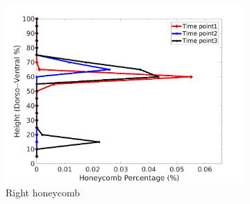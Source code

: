 \begin{figure}[H]
\begin{subfigure}{.42\linewidth}
  \includegraphics[width=\linewidth,trim={{.0\wd0} {.0\wd0} {.0\wd0} {.0\wd0}},clip]{Appendix/Image_AppexA/DorsoToVentral/IPF6RightLungHoneycombDiseaseDorsoToVentral.jpg}
  \caption{Right honeycomb}
  \label{fig:IPF6DiseaseDorsoToVentral-f}
\end{subfigure}
\begin{subfigure}{.42\linewidth}%

\end{subfigure}
\end{figure}
